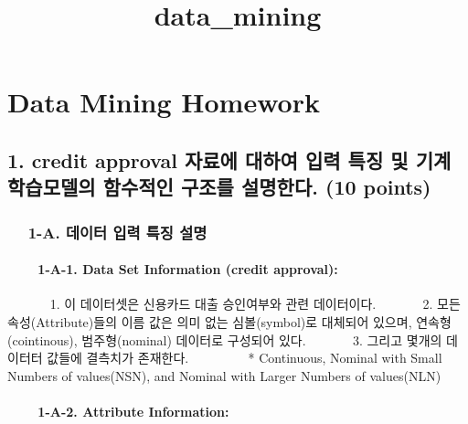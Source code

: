 \documentclass[11pt]{article}
\title{data\_mining}
\begin{document}
    
    
    \maketitle
    
    

    
    \hypertarget{data-mining-homework}{%
\section{Data Mining Homework}\label{data-mining-homework}}

    \hypertarget{credit-approval-uxc790uxb8ccuxc5d0-uxb300uxd558uxc5ec-uxc785uxb825-uxd2b9uxc9d5-uxbc0f-uxae30uxacc4uxd559uxc2b5uxbaa8uxb378uxc758-uxd568uxc218uxc801uxc778-uxad6cuxc870uxb97c-uxc124uxba85uxd55cuxb2e4.-10-points}{%
\subsection{1. credit approval 자료에 대하여 입력 특징 및 기계학습모델의
함수적인 구조를 설명한다. (10
points)}\label{credit-approval-uxc790uxb8ccuxc5d0-uxb300uxd558uxc5ec-uxc785uxb825-uxd2b9uxc9d5-uxbc0f-uxae30uxacc4uxd559uxc2b5uxbaa8uxb378uxc758-uxd568uxc218uxc801uxc778-uxad6cuxc870uxb97c-uxc124uxba85uxd55cuxb2e4.-10-points}}

    \hypertarget{a.-uxb370uxc774uxd130-uxc785uxb825-uxd2b9uxc9d5-uxc124uxba85}{%
\subsubsection{  1-A. 데이터 입력 특징
설명}\label{a.-uxb370uxc774uxd130-uxc785uxb825-uxd2b9uxc9d5-uxc124uxba85}}

    \hypertarget{a-1.-data-set-information-credit-approval}{%
\paragraph{   1-A-1. Data Set Information (credit
approval):}\label{a-1.-data-set-information-credit-approval}}

        1. 이 데이터셋은 신용카드 대출 승인여부와 관련 데이터이다.     2.
모든 속성(Attribute)들의 이름 값은 의미 없는 심볼(symbol)로 대체되어
있으며, 연속형(cointinous), 범주형(nominal) 데이터로 구성되어 있다.    
3. 그리고 몇개의 데이터터 값들에 결측치가 존재한다.      * Continuous,
Nominal with Small Numbers of values(NSN), and Nominal with Larger
Numbers of values(NLN)

    \hypertarget{a-2.-attribute-information}{%
\paragraph{   1-A-2. Attribute
Information:}\label{a-2.-attribute-information}}
\end{document}
